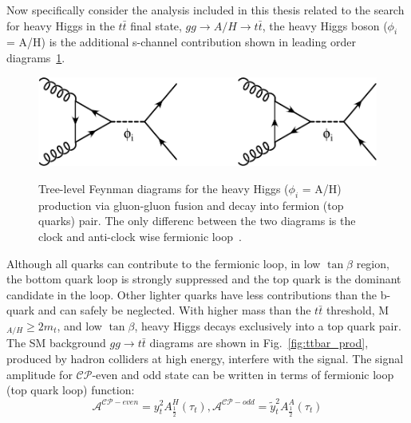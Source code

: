 Now specifically consider the analysis included in this thesis related to the search for heavy Higgs in the $t\bar t$ final state, $gg\rightarrow A/H \rightarrow t\bar t$, the heavy Higgs boson ($\phi_{i}$ = A/H) is the additional s-channel contribution shown in leading order diagrams~\ref{fig:ggh_production_to_ttbar}. 
\begin{figure}[htp]
\centering
\includegraphics[scale=0.7]{fig/sm_beyond/gg-higgs-tt.pdf}\\
\caption{Tree-level Feynman diagrams for the heavy Higgs ($\phi_{i}$ = A/H) production via gluon-gluon fusion and decay into fermion (top quarks) pair. The only differenc between the two diagrams is the clock and anti-clock wise fermionic loop~\cite{Bernreuther:2015fts}. }\label{fig:ggh_production_to_ttbar}
\end{figure}
Although all quarks can contribute to the fermionic loop, in low $\tan\beta$ region, the bottom quark loop is strongly suppressed and the top quark is the dominant candidate in the loop. Other lighter quarks have less contributions than the b-quark and can safely be neglected. With higher mass than the $t\bar t$ threshold, M$_{A/H}\geq 2m_{t}$, and low $\tan\beta$, heavy Higgs decays exclusively into a top quark pair. The SM background $gg\rightarrow t\bar t$ diagrams are shown in Fig.~\ref{fig:ttbar_prod}, produced by hadron colliders at high energy, interfere with the signal. The signal amplitude for $\mathcal{CP}$-even and odd state can be written in terms of fermionic loop (top quark loop) function:
\begin{equation}\label{equ:A_H_amplitudes}
\mathcal{A}^{\mathcal{CP}-even} = y_{t}^{2}A^{H}_{\frac{1}{2}}(\tau_{t}), 
\mathcal{A}^{\mathcal{CP}-odd} = \tilde{y}_{t}^{2}A^{A}_{\frac{1}{2}}(\tau_{t})
\end{equation}
